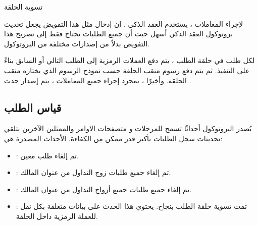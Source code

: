 \documentclass[12pt, a4paper, leqno]{report}
\makeatletter
\newenvironment{figurehere}
 {\def\@captype{figure}}
 {}
\theoremstyle{plain}
\theoremstyle{definition}
\makeatother
\begin{document}
\begin{multicols}{2}
\begin{otherlanguage}{arabic}
\begin{center}
\begin{figurehere}
\caption{تسوية الحلقة}
\label{fig:settlement}
\end{figurehere}
\end{center}

لإجراء المعاملات ، يستخدم  العقد الذكي . إن إدخال مثل هذا التفويض يجعل تحديث بروتوكول العقد الذكي أسهل حيث أن جميع الطلبات تحتاج فقط إلى تصريح هذا التفويض بدلاً من إصدارات مختلفة من البروتوكول.

لكل طلب في حلقة الطلب ، يتم دفع العملات الرمزية إلى الطلب التالي أو السابق بناءً على التنفيذ. ثم يتم دفع رسوم منقب الحلقة حسب نموذج الرسوم الذي يختاره منقب الحلقة. وأخيرًا ، بمجرد إجراء جميع المعاملات ، يتم إصدار حدث .

\subsection{قياس الطلب}
يُصدر البروتوكول أحداثًا تسمح للمرحلات و متصفحات الاوامر والممثلين الآخرين بتلقي تحديثات سجل الطلبات بأكبر قدر ممكن من الكفاءة. الأحداث المصدرة هي:
\begin{itemize}
	\item \textbf{} : تم إلغاء طلب معين.
	\item \textbf{} : تم إلغاء جميع طلبات زوج التداول من عنوان المالك.
	\item \textbf{} : تم إلغاء جميع طلبات جميع أزواج التداول من عنوان المالك.
	\item \textbf{} : تمت تسوية حلقة الطلب بنجاح. يحتوي هذا الحدث على بيانات متعلقة بكل نقل للعملة الرمزية داخل الحلقة.
\end{itemize}
\end{otherlanguage}
\end{multicols}

\end{document}
